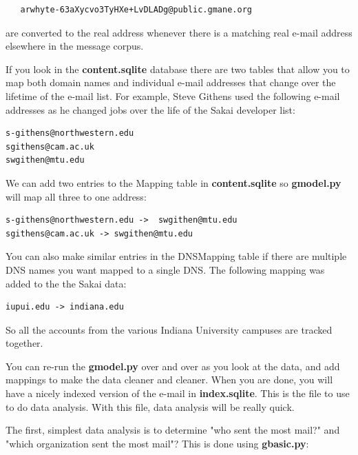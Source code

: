 \documentclass[11pt]{book}
\begin{document}
\beforeverb
\begin{verbatim}
   arwhyte-63aXycvo3TyHXe+LvDLADg@public.gmane.org
\end{verbatim}
\afterverb
%
are converted to the real address whenever there is a matching real e-mail
address elsewhere in the message corpus.

If you look in the {\bf content.sqlite} database there are two tables that allow
you to map both domain names and individual e-mail addresses that change over 
the lifetime of the e-mail list.  For example, Steve Githens used the following
e-mail addresses as he changed jobs over the life of the Sakai developer list:

\beforeverb
\begin{verbatim}
s-githens@northwestern.edu
sgithens@cam.ac.uk
swgithen@mtu.edu
\end{verbatim}
\afterverb
%
We can add two entries to the Mapping table in {\bf content.sqlite} so 
{\bf gmodel.py} will map all three to one address:

\beforeverb
\begin{verbatim}
s-githens@northwestern.edu ->  swgithen@mtu.edu
sgithens@cam.ac.uk -> swgithen@mtu.edu
\end{verbatim}
\afterverb
%
You can also make similar entries in the DNSMapping table if there are multiple
DNS names you want mapped to a single DNS.  The following mapping was added to the the Sakai data:

\beforeverb
\begin{verbatim}
iupui.edu -> indiana.edu
\end{verbatim}
\afterverb
%
So all the accounts from the various Indiana University campuses are tracked together.

You can re-run the {\bf gmodel.py} over and over as you look at the data, and add mappings
to make the data cleaner and cleaner.   When you are done, you will have a nicely
indexed version of the e-mail in {\bf index.sqlite}.   This is the file to use to do data
analysis.   With this file, data analysis will be really quick.

The first, simplest data analysis is to determine "who sent the most mail?" and "which 
organization sent the most mail"?  This is done using {\bf gbasic.py}:
\end{document}
